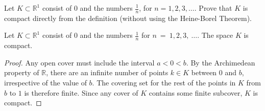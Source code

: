\setcounter{exercise}{11}
\begin{exercise}
	Let $K \subset \mathbb{R}^1$ consist of $0$ and the numbers $\frac{1}{n}$, for $n = 1, 2, 3, \ldots$. Prove that $K$ is compact directly from the definition (without using the Heine-Borel Theorem).
\end{exercise}
\begin{proposition}
	Let $K \subset \mathbb{R}^1$ consist of $0$ and the numbers $\frac{1}{n}$ for $n~=~1, 2, 3,~\ldots$. The space $K$ is compact.
\end{proposition}
\begin{proof}
	Any open cover must include the interval $a < 0 < b$. By the Archimedean property of $\mathbb{R}$, there are an infinite number of points $k \in K$ between $0$ and $b$, irrespective of the value of $b$. The covering set for the rest of the points in $K$ from $b$ to $1$ is therefore finite.
	\newline\newline
	Since any cover of $K$ contains some finite subcover, $K$ is compact.
\end{proof}
